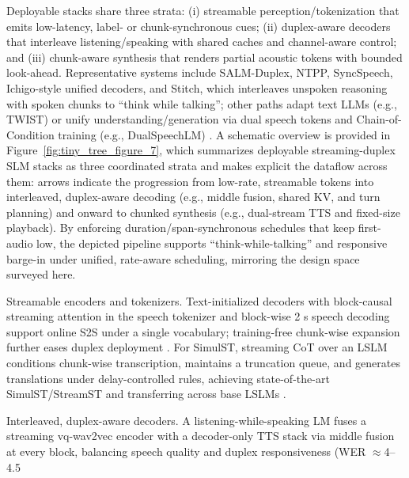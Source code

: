 \documentclass{article}
\begin{document}
Deployable stacks share three strata: (i) streamable perception/tokenization that emits low-latency, label- or chunk-synchronous cues; (ii) duplex-aware decoders that interleave listening/speaking with shared caches and channel-aware control; and (iii) chunk-aware synthesis that renders partial acoustic tokens with bounded look-ahead. Representative systems include SALM-Duplex, NTPP, SyncSpeech, Ichigo-style unified decoders, and Stitch, which interleaves unspoken reasoning with spoken chunks to ``think while talking''; other paths adapt text LLMs (e.g., TWIST) or unify understanding/generation via dual speech tokens and Chain-of-Condition training (e.g., DualSpeechLM) \cite{chiang2025stitchsimultaneousthinkingtalkingchunked,hassid2024textuallypretrainedspeechlanguagemodels,wang2025dualspeechlmtowardsunifiedspeechundersta}. A schematic overview is provided in Figure~\ref{fig:tiny_tree_figure_7}, which summarizes deployable streaming-duplex SLM stacks as three coordinated strata and makes explicit the dataflow across them: arrows indicate the progression from low-rate, streamable tokens into interleaved, duplex-aware decoding (e.g., middle fusion, shared KV, and turn planning) and onward to chunked synthesis (e.g., dual-stream TTS and fixed-size playback). By enforcing duration/span-synchronous schedules that keep first-audio low, the depicted pipeline supports ``think-while-talking'' and responsive barge-in under unified, rate-aware scheduling, mirroring the design space surveyed here.

Streamable encoders and tokenizers. Text-initialized decoders with block-causal streaming attention in the speech tokenizer and block-wise 2 s speech decoding support online S2S under a single vocabulary; training-free chunk-wise expansion further eases duplex deployment \cite{zeng2024scalingspeechtextpretrainingsyntheticint,chang2024dcspinspeakerinvariantspeechtokenizerspo}. For SimulST, streaming CoT over an LSLM conditions chunk-wise transcription, maintains a truncation queue, and generates translations under delay-controlled rules, achieving state-of-the-art SimulST/StreamST and transferring across base LSLMs \cite{guo2025streamuniachievingstreamingspeechtransla}.

Interleaved, duplex-aware decoders. A listening-while-speaking LM fuses a streaming vq-wav2vec encoder with a decoder-only TTS stack via middle fusion at every block, balancing speech quality and duplex responsiveness (WER $\approx$4--4.5%
\end{document}
